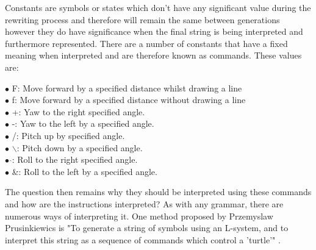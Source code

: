 \begin{flushleft}

Constants are symbols or states which don't have any significant value during the rewriting process and therefore will remain the same between generations however they do have significance when the final string is being interpreted and furthermore represented. There are a number of constants that have a fixed meaning when interpreted and are therefore known as commands. These values are:

\vspace{5mm}

$\bullet$ F: 				\hspace{10mm}  		Move forward by a specified distance whilst drawing a line \\
$\bullet$ f: 				\hspace{10mm} 		Move forward by a specified distance without drawing a line \\
$\bullet$ +: 				\hspace{10mm} 		Yaw to the right specified angle. \\
$\bullet$ -: 				\hspace{10mm} 		Yaw to the left by a specified angle.  \\
$\bullet$ /: 				\hspace{10mm} 		Pitch up by specified angle. \\
$\bullet$ $\backslash$: 	\hspace{10mm} 		Pitch down by a specified angle.  \\
$\bullet$ $\hat{}$: 		\hspace{10mm} 		Roll to the right specified angle. \\
$\bullet$ \&:				\hspace{10mm}  		Roll to the left by a specified angle.  \\

\vspace{5mm}

The question then remains why they should be interpreted using these commands and how are the instructions interpreted? As with any grammar, there are numerous ways of interpreting it. One method proposed by Przemyslaw Prusinkiewics is "To generate a string of symbols using an L-system, and to interpret this string as a sequence of commands which control a 'turtle'" \cite{prusinkiewicz1986graphical}.\\

\vspace{5mm}


\end{flushleft}
